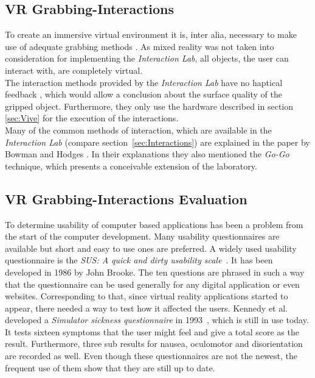 \subsection{VR Grabbing-Interactions}\label{sec:SOTAInteractions}
To create an immersive virtual environment it is, inter alia, necessary to make use of adequate grabbing methods \cite{Bowman}. As mixed reality was not taken into consideration for implementing the \textit{Interaction Lab}, all objects, the user can interact with, are completely virtual. \\
The interaction methods provided by the \textit{Interaction Lab} have no haptical feedback \cite{768179}, which would allow a conclusion about the surface quality of the gripped object. Furthermore, they only use the hardware described in section \ref{sec:Vive} for the execution of the interactions. \\
Many of the common methods of interaction, which are available in the \textit{Interaction Lab} (compare section~\ref {sec:Interactions}) are explained in the paper by Bowman and Hodges \cite{Bowman}. In their explanations they also mentioned the  \textit{Go-Go} technique, which presents a conceivable extension of the laboratory.

\subsection{VR Grabbing-Interactions Evaluation}\label{sec:SOTAInteractionEvalution}
To determine usability of computer based applications has been a problem from the start of the computer development. Many usability questionnaires are available but short and easy to use ones are preferred. A widely used usability questionnaire is the \textit{SUS: A quick and dirty usability scale}~\cite{6sus}. It has been developed in 1986 by John Brooke. The ten questions are phrased in such a way that the questionnaire can be used generally for any digital application or even websites. 
Corresponding to that, since virtual reality applications started to appear, there needed a way to test how it affected the users. Kennedy et al. developed a \textit{Simulator sickness questionnaire} in 1993~\cite{ssq}, which is still in use today. It tests sixteen symptoms that the user might feel and give a total score as the result. Furthermore, three sub results for nausea, oculomotor and disorientation are recorded as well. Even though these questionnaires are not the newest, the frequent use of them show that they are still up to date. 

\newpage
